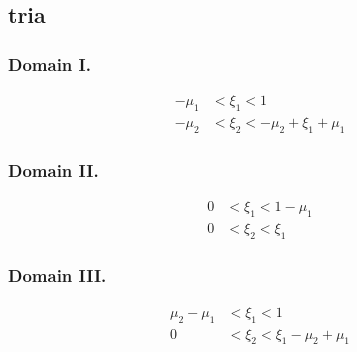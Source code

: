 \documentclass{article}
\begin{document}
\subsection{tria}

\newcommand{\commontri}{
\path [draw=gray] (1,0) -- (1,1) -- (0,1) -- (-1,0) -- (-1,-1) -- (0,-1) -- cycle;
\path [draw=gray] (-1,0) -- (1,0);
\path [draw=gray] (0,-1) -- (0,1);
\path [draw=gray] (-1,-1) -- (1,1);
\path [draw, ->] (-.2,0) -- (1.2,0) node [anchor = west] {$\xi_1$};
\path [draw, ->] (0,-.2) -- (0,1.2) node [anchor = south] {$\xi_2$};
\path [fill=red, opacity=.5] (0-\m,0-\p) -- (1-\m,0-\p) -- (1-\m,1-\p) -- cycle;
\path [fill = blue, opacity=.5] (0,0) -- (1,0) -- (1,1) -- cycle;
\path [draw, fill] (\m,\p) circle(.03) -- (-\m,-\p) circle(.03);
}


\subsubsection{Domain I.}
%
%
\begin{align}
-\mu_1 &< \xi_1 < 1 \nonumber \\
-\mu_2 &< \xi_2 < -\mu_2 + \xi_1+\mu_1 \nonumber
\end{align}


\subsubsection{Domain II.}
%
%
\begin{align}
0 &< \xi_1 < 1-\mu_1 \nonumber \\
0 &< \xi_2 < \xi_1 \nonumber
\end{align}



\subsubsection{Domain III.}
%
%
\begin{align}
\mu_2-\mu_1 &< \xi_1 < 1 \nonumber \\
0 &< \xi_2 < \xi_1 - \mu_2+\mu_1\nonumber
\end{align}
\end{document}
